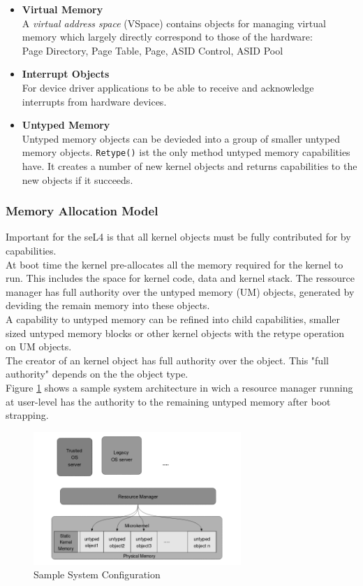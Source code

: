 \documentclass[pdftex,11pt,a4paper]{article}
\begin{document}
\begin{itemize}
	\item \textbf{Virtual Memory}\\
	A \textit{virtual address space} (VSpace) contains objects for managing virtual memory which largely directly correspond to those of the hardware: \\
	Page Directory, Page Table, Page, ASID Control, ASID Pool
	\item \textbf{Interrupt Objects} \\
	For device driver applications to be able to receive and acknowledge interrupts from hardware devices.
	\item \textbf{Untyped Memory} \\
	Untyped memory objects can be devieded into a group of smaller untyped memory objects. \texttt{Retype()} ist the only method untyped memory capabilities have. It creates a number of new kernel objects and returns capabilities to the new objects if it succeeds. 
	\end{itemize}

	\subsubsection{Memory Allocation Model}
	Important for the seL4 is that all kernel objects must be fully contributed for by capabilities. \\
	At boot time the kernel pre-allocates all the memory required for the kernel to run. This includes the space for kernel code, data and kernel stack. The ressource manager has full authority over the untyped memory (UM) objects, generated by deviding the remain memory into these objects. \\
	A capability to untyped memory can be refined into child capabilities, smaller sized untyped memory blocks or other kernel objects with the retype operation on UM objects. \\
	The creator of an kernel object has full authority over the object. This "full authority" depends on the the object type. \\
	Figure \ref{fig:systarch} shows a sample system architecture in wich a resource manager running at user-level  has the authority to the remaining untyped memory after boot strapping. 
	
	\begin{figure}[ht]
	\centering
		\includegraphics[width=0.7\textwidth]{./Pictures/MemoryAllocation.png}
	\caption[Sample system architecture]{Sample System Configuration \cite{TakeG}}
	\label{fig:systarch}
	\end{figure}	
	
\end{document}
